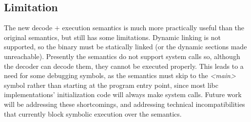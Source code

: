 \subsection{Limitation}
The new decode $+$ execution semantics is much more practically useful than the original semantics, but still has some limitations.  Dynamic linking is not supported, so the binary must be statically linked (or the dynamic sections made unreachable).  Presently the semantics do not support system calls so, although the decoder can decode them, they cannot be executed properly.  This leads to a need for some debugging symbols, as the semantics must skip to the \emph{<main>} symbol rather than starting at the program entry point, since most libc implementations’ initialization code will always make system calls.  Future work will be addressing these shortcomings, and addressing technical incompatibilities that currently block symbolic execution over the semantics.
